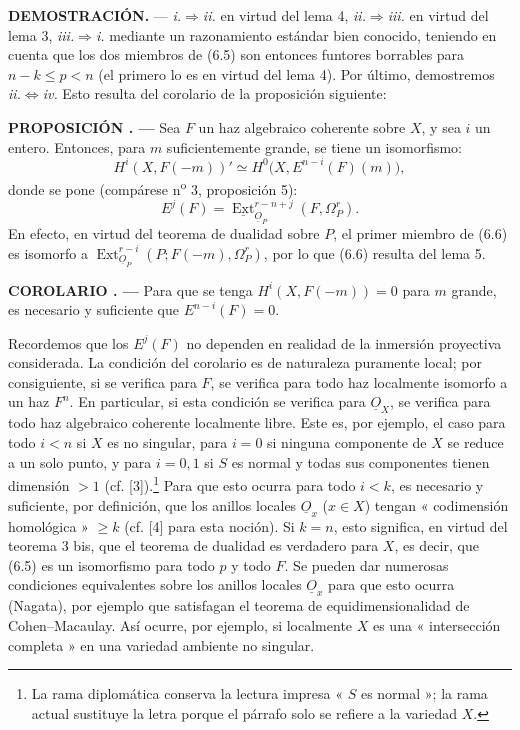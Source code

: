 \documentclass[11pt,twoside,openany]{book}
\numberwithin{equation}{section}
\newcommand{\src}[1]{%
  \phantomsection\hypertarget{src:#1}{}%
  \marginpar{\raggedleft\footnotesize\sffamily #1}%
}
\newcommand{\Osh}{\underline{O}}
\newcommand{\Extsh}{\underline{\operatorname{Ext}}}
\theoremstyle{plain}
\theoremstyle{definition}
\theoremstyle{remark}
\newcommand{\result}[2]{%
  \par\medskip\noindent\textbf{#1%
  \if\relax\detokenize{#2}\relax\else\space#2\fi. ---}\enspace
}
\newcommand{\FgaUnitKey}{frontmatter}
\renewcommand{\src}[1]{%
  \phantomsection\hypertarget{src:\FgaUnitKey:#1}{}%
  \marginpar{\raggedleft\footnotesize\sffamily #1}%
}
\theoremstyle{plain}
\theoremstyle{definition}
\theoremstyle{remark}
\begin{document}
\noindent\textbf{DEMOSTRACIÓN.} --- \textit{i.}$\Rightarrow$\textit{ii.} en
virtud del lema 4, \textit{ii.}$\Rightarrow$\textit{iii.} en virtud del lema 3,
\textit{iii.}$\Rightarrow$\textit{i.} mediante un razonamiento estándar bien conocido,
teniendo en cuenta que los dos miembros de (6.5) son entonces funtores borrables
para $n-k\leq p<n$ (el primero lo es en virtud del lema 4). Por último, demostremos
\textit{ii.}$\Leftrightarrow$\textit{iv.} Esto resulta del corolario de la
proposición siguiente:

\result{PROPOSICIÓN}{6} Sea $F$ un haz algebraico coherente sobre $X$, y
sea $i$ un entero. Entonces, para $m$ suficientemente grande, se tiene un isomorfismo:
\begin{equation}\tag{6.6}
  H^{i}(X,F(-m))'
  \simeq H^{0}\bigl(X,E^{n-i}(F)(m)\bigr),
\end{equation}
donde se pone (compárese n\textsuperscript{o} 3, proposición 5):
\begin{equation}\tag{6.7}
  E^{j}(F)=\Extsh_{\Osh_P}^{r-n+j}(F,\Omega_P^{r}).
\end{equation}
En efecto, en virtud del teorema de dualidad sobre $P$, el primer miembro de (6.6)
es isomorfo a
$\operatorname{Ext}_{\Osh_P}^{r-i}(P;F(-m),\Omega_P^{r})$, por lo que (6.6) resulta
del lema 5.

\src{187}
\result{COROLARIO}{} Para que se tenga $H^{i}(X,F(-m))=0$ para $m$ grande, es
necesario y suficiente que $E^{n-i}(F)=0$.

Recordemos que los $E^{j}(F)$ no dependen en realidad de la inmersión proyectiva
considerada. La condición del corolario es de naturaleza puramente local; por consiguiente,
si se verifica para $F$, se verifica para todo haz localmente
isomorfo a un haz $F^{n}$. En particular, si esta condición se verifica
para $\Osh_X$, se verifica para todo haz algebraico coherente localmente
libre. Este es, por ejemplo, el caso para todo $i<n$ si $X$ es no singular, para
$i=0$ si ninguna componente de $X$ se reduce a un solo punto, y para $i=0,1$
si $S$ es normal y todas sus componentes tienen dimensión $>1$ (cf.
[3]).\footnote{La rama diplomática conserva la lectura impresa « $S$ es
normal »; la rama actual sustituye la letra porque el párrafo solo se refiere
a la variedad $X$.} Para que esto ocurra para todo
$i<k$, es necesario y suficiente, por definición, que los anillos locales
$\Osh_x$ ($x\in X$) tengan « codimensión homológica » $\geq k$ (cf. [4]
para esta noción). Si $k=n$, esto significa, en virtud del teorema 3 bis, que el
teorema de dualidad es verdadero para $X$, es decir, que (6.5) es un isomorfismo para
todo $p$ y todo $F$. Se pueden dar numerosas condiciones equivalentes sobre
los anillos locales $\Osh_x$ para que esto ocurra (Nagata), por ejemplo que
satisfagan el teorema de equidimensionalidad de Cohen--Macaulay. Así ocurre,
por ejemplo, si localmente $X$ es una « intersección completa » en una
variedad ambiente no singular.
\end{document}
